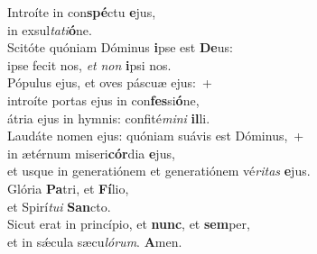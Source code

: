\evenverse Introíte in con\textbf{spé}ctu \textbf{e}jus,~\*\\
\evenverse in exsul\textit{ta}\textit{ti}\textbf{ó}ne.\\
\oddverse Scitóte quóniam Dóminus \textbf{i}pse est \textbf{De}us:~\*\\
\oddverse ipse fecit nos, \textit{et} \textit{non} \textbf{i}psi nos.\\
\evenverse Pópulus ejus, et oves páscuæ ejus:~+\\
\evenverse  introíte portas ejus in con\textbf{fes}si\textbf{ó}ne,~\*\\
\evenverse átria ejus in hymnis: confité\textit{mi}\textit{ni} \textbf{il}li.\\
\oddverse Laudáte nomen ejus: quóniam suávis est Dóminus,~+\\
\oddverse  in ætérnum miseri\textbf{cór}dia \textbf{e}jus,~\*\\
\oddverse et usque in generatiónem et generatiónem vé\textit{ri}\textit{tas} \textbf{e}jus.\\
\evenverse Glória \textbf{Pa}tri, et \textbf{Fí}lio,~\*\\
\evenverse et Spirí\textit{tu}\textit{i} \textbf{San}cto.\\
\oddverse Sicut erat in princípio, et \textbf{nunc}, et \textbf{sem}per,~\*\\
\oddverse et in sǽcula sæcu\textit{ló}\textit{rum}. \textbf{A}men.\\
